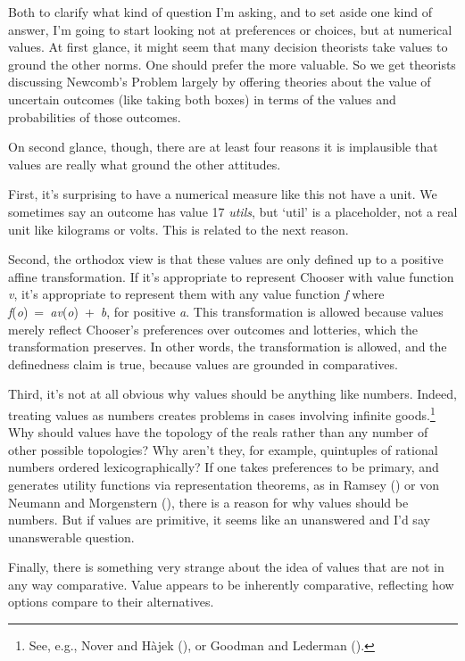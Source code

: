 \documentclass[
  10.5pt,
  twoside]{article}
\begin{document}
Both to clarify what kind of question I'm asking, and to set aside one
kind of answer, I'm going to start looking not at preferences or
choices, but at numerical values. At first glance, it might seem that
many decision theorists take values to ground the other norms. One
should prefer the more valuable. So we get theorists discussing
Newcomb's Problem largely by offering theories about the value of
uncertain outcomes (like taking both boxes) in terms of the values and
probabilities of those outcomes.

On second glance, though, there are at least four reasons it is
implausible that values are really what ground the other attitudes.

First, it's surprising to have a numerical measure like this not have a
unit. We sometimes say an outcome has value 17 \emph{utils}, but `util'
is a placeholder, not a real unit like kilograms or volts. This is
related to the next reason.

Second, the orthodox view is that these values are only defined up to a
positive affine transformation. If it's appropriate to represent Chooser
with value function \emph{v}, it's appropriate to represent them with
any value function \emph{f} where
\emph{f}(\emph{o})~=~\emph{av}(\emph{o})~+~\emph{b}, for positive
\emph{a}. This transformation is allowed because values merely reflect
Chooser's preferences over outcomes and lotteries, which the
transformation preserves. In other words, the transformation is allowed,
and the definedness claim is true, because values are grounded in
comparatives.

Third, it's not at all obvious why values should be anything like
numbers. Indeed, treating values as numbers creates problems in cases
involving infinite goods.\footnote{See, e.g., Nover and Hàjek
  (), or Goodman and Lederman
  ().} Why should values have
the topology of the reals rather than any number of other possible
topologies? Why aren't they, for example, quintuples of rational numbers
ordered lexicographically? If one takes preferences to be primary, and
generates utility functions via representation theorems, as in Ramsey
() or von Neumann and Morgenstern
(), there is a reason for why values
should be numbers. But if values are primitive, it seems like an
unanswered and I'd say unanswerable question.

Finally, there is something very strange about the idea of values that
are not in any way comparative. Value appears to be inherently
comparative, reflecting how options compare to their alternatives.
\end{document}
